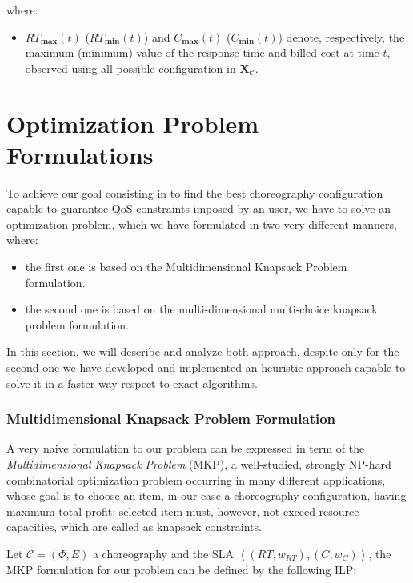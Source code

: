 \documentclass[12pt,a4paper]{report}
\begin{document}
where:

\begin{itemize}
	\item $RT_{\textbf{max}}(t)$ ($RT_{\textbf{min}}(t)$) and $C_{\textbf{max}}(t)$ ($C_{\textbf{min}}(t)$) denote, respectively, the maximum (minimum) value of the response time and billed cost at time $t$, observed using all possible configuration in $\textbf{X}_{\mathcal{C}}$.
\end{itemize}

\chapter{Optimization Problem Formulations}

To achieve our goal consisting in to find the best choreography configuration capable to guarantee QoS constraints imposed by an user, we have to solve an optimization problem, which we have formulated in two very different manners, where:

\begin{itemize}
	\item the first one is based on the Multidimensional Knapsack Problem formulation.
	\item the second one is based on the multi-dimensional multi-choice knapsack problem formulation. 
\end{itemize}

In this section, we will describe and analyze both approach, despite only for the second one we have developed and implemented an heuristic approach capable to solve it in a faster way respect to exact algorithms. 

\subsection{Multidimensional Knapsack Problem Formulation}

A very naive formulation to our problem can be expressed in term of the \textit{Multidimensional Knapsack Problem} (MKP), a well-studied, strongly NP-hard combinatorial optimization problem occurring in many different applications, whose goal is to choose an item, in our case a choreography configuration, having maximum total profit; selected item  must, however, not exceed resource capacities, which are called as knapsack constraints.

Let $\mathcal{C} = (\Phi,E)$ a choreography and the SLA $\left\langle (RT,w_{RT}),(C,w_{C}) \right\rangle$, the MKP formulation for our problem can be defined by the following ILP:
\end{document}
